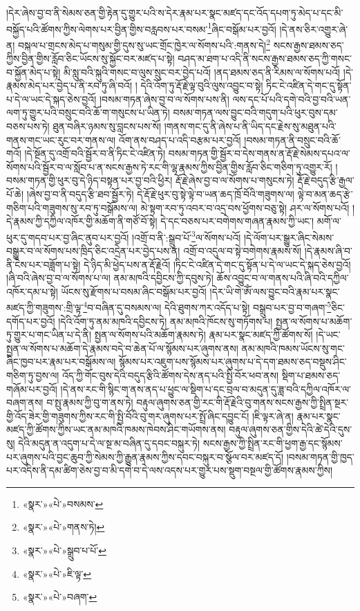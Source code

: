 །དེར་ཞེས་བྱ་བ་ནི་སེམས་ཅན་གྱི་རྟེན་དུ་གྱུར་པའི་ས་དེར་རྣམ་པར་སྣང་མཛད་དང་འོད་དཔག་ཏུ་མེད་པ་དང་མི་བསྐྱོད་པའི་ཚོགས་ཀྱིས་ལེགས་པར་བྱིན་གྱིས་བརླབས་པར་བསམ་\footnote{«སྣར་»«པེ་»བསམས་}ཞིང་བསྒོམ་པར་བྱའོ། །དེ་ནས་ཅིར་འགྱུར་ཞེ་ན། བསྐལ་པ་གྲངས་མེད་པ་གསུམ་གྱི་དུས་སུ་ཡང་གྲོང་ཁྱེར་ལ་སོགས་པའི་:གནས་དེ།\footnote{«སྣར་»«པེ་»གནས་ཏེ།} སངས་རྒྱས་ཐམས་ཅད་ཀྱིས་བྱིན་གྱིས་རློབ་ཅིང་ཡོངས་སུ་སྐྱོང་བར་མཛད་པ་སྟེ། བཤད་མ་ཐག་པ་འདི་ནི་སངས་རྒྱས་ཐམས་ཅད་ཀྱི་གསང་བ་སྐྱོན་མེད་པ་སྟེ། མི་སླུ་བའི་སྐུའི་གསང་བ་ལུས་སྲུང་བར་བྱེད་པའོ། །ནད་ཐམས་ཅད་ནི་རིམས་ལ་སོགས་པའོ། །དེ་རྣམས་མེད་པར་བྱེད་པ་ནི་རབ་ཏུ་ཞི་བའོ། །
དེའི་འོག་ཏུ་རྡོ་རྗེ་ལྟ་བུའི་ལུས་འབྱུང་བ་སྟེ། ཏིང་ངེ་འཛིན་དེ་གང་དུ་སྟོན་པ་དེ་ལ་ཡང་དེ་སྐད་ཅེས་བྱའོ། །བསམ་གཏན་ཞེས་བྱ་བ་ལ་སོགས་པས་ནི། ལས་དང་པོ་པའི་དགེ་བའི་བྱ་བའི་ཡན་ལག་ཏུ་གྱུར་པའི་བསྲུང་བའི་ཆོ་ག་གསུངས་པ་ཡིན་ཏེ། བསམ་གཏན་ལས་བྱུང་བའི་གདུག་པའི་ཕུར་བུས་དམ་བཅས་པས་ཏེ། ཐུན་བཞིར་ཉམས་སུ་བླངས་པས་སོ། །གནས་གང་དུ་ནི་ཞེས་པ་ནི་ཡིད་དང་རྗེས་སུ་མཐུན་པའི་གནས་གང་ཡང་རུང་བར་གནས་ལ། འོག་ནས་བཤད་པ་འདི་བརྩམ་པར་བྱའོ། །བསམ་གཏན་ནི་བསྲུང་བའི་ཆོ་གའོ། །དེ་སྔོན་དུ་འགྲོ་བའི་སྦྱོར་བ་ནི་ཏིང་ངེ་འཛིན་ཏེ། བསམ་གཏན་གྱི་སྦྱོར་བ་དེས་གནས་ན་རྡོ་རྗེ་སེམས་དཔའ་ལ་སོགས་པའི་སྦྱོར་བ་ལ་སློབ་པ་ན་སངས་རྒྱས་ཏེ་རང་གི་ལྷ་རྣམས་ཀྱིས་བྱིན་གྱིས་རློབ་ཅིང་གཅིག་ཏུ་འགྱུར་རོ། །བསམ་གཏན་གྱི་ཕུར་བུ་དེ་ཉིད་བསྟན་པར་བྱ་བའི་ཕྱིར། རྡོ་རྗེ་ཞེས་བྱ་བ་ལ་སོགས་པ་གསུངས་ཏེ། རྡོ་རྗེ་བདུད་རྩི་རྒྱལ་པོ་ཆེ། །ཞེས་བྱ་བ་ནི་བདུད་རྩི་ཐབ་སྦྱོར་ཏེ། དེ་རྡོ་རྗེ་ཕུར་བུ་སྟེ་ལྟེ་བ་ཡན་ཆད་ཁྲོ་བོའི་གཟུགས་ལ། ལྟེ་བ་མན་ཆད་རྩེ་གཅིག་པའི་གཟུགས་སུ་རབ་ཏུ་བསྒོམས་ལ། མེ་སྟག་རབ་ཏུ་འབར་བ་འདྲ་བས་ཕྱོགས་བཅུ་སྟེ། ཤར་ལ་སོགས་པའོ། །དེ་རྣམས་ཀྱི་དཀྱིལ་འཁོར་གྱི་མཆོག་ནི་གཙོ་བོ་སྟེ། དེ་དང་བཅས་པར་བགེགས་གཞན་རྣམས་ཀྱི་ཡང་། མགོ་ལ་ཕུར་དུ་གདབ་པར་བྱ་ཞིང་ནུབ་པར་བྱའོ། །འགྲོ་བ་ནི་:སྒྲུབ་པོ་\footnote{«སྣར་»«པེ་»སྒྲུབ་པ་པོ་}ལ་སོགས་པའོ། །དེ་ལོག་པར་སྒྱུར་ཞིང་སེམས་བསྒྱུར་བ་ལ་སོགས་པས་ཁྲིད་ཅིང་འདྲེན་པར་བྱེད་པས་ན། འགྲོ་བ་འདུལ་བ་སྟེ་བགེགས་རྣམས་སོ། །དེ་རྣམས་ཞི་བ་ནི་ངེས་པར་བཟློག་པ་སྟེ། དེ་ཉིད་མི་ཕྱེད་པས་ན་རྡོ་རྗེའོ། །ཏིང་ངེ་འཛིན་དེ་གང་དུ་སྟོན་པ་དེ་ལ་ཡང་དེ་སྐད་ཅེས་བྱའོ། །ཞི་བའི་ཞེས་བྱ་བ་ལ་སོགས་པ་ལ། ནམ་མཁའི་དབྱིངས་ཀྱི་དབུས་ཏེ། ཆོས་འབྱུང་བ་ལ་གནས་པའི་ཞི་བའི་དཀྱིལ་འཁོར་དམ་པ་སྟེ། ཡོངས་སུ་རྫོགས་པ་བསམ་ཞིང་བསྒོམ་པར་བྱའོ། །དེར་ཡི་གེ་ཨོཾ་ལས་བྱུང་བའི་རྣམ་པར་སྣང་མཛད་ཀྱི་གཟུགས་:གྲི་ལྟ་\footnote{«སྣར་»«པེ་»ཇི་ལྟ་}བ་བཞིན་དུ་བསམས་ལ། དེའི་ཐུགས་ཀར་འདོད་པ་སྟེ། བསྒྲུབ་པར་བྱ་བ་གཞག་\footnote{«སྣར་»«པེ་»བཞག་}ཅིང་དགོད་པར་བྱའོ། །དེའི་འོག་ཏུ་ནམ་མཁའི་དབྱིངས་ཏེ། ནམ་མཁའི་ཁོངས་སུ་གཏོགས་པ། སྤྱན་ལ་སོགས་པ་མཆོག་ཏུ་གྱུར་པ་གང་ཡིན་པ་དེ་ནི། སྤྱན་ལ་སོགས་པའི་མཆོག་རྣམས་ཏེ། རྣམ་པར་སྣང་མཛད་ཀྱི་ཚོགས་སོ། །དེ་ཡང་སྤྱན་ལ་སོགས་པ་མཆོག་དེ་རྣམས་བདེ་བ་ཆེན་པོ་ལ་སྙོམས་པར་ཞུགས་ནས། ནམ་མཁའི་ཁམས་ཡོངས་སུ་གང་ཞིང་ཁྱབ་པར་རྣམ་པར་བསྒོམས་ལ། སྙོམས་པར་འཇུག་པས་སྙོམས་པར་ཞུགས་པ་དེ་དག་ཐམས་ཅད་བསྡུས་ཤིང་གཅིག་ཏུ་བྱས་ལ། འོད་ཀྱི་གོང་བུས་དེའི་བདུད་རྩིའི་ཚོགས་དེས་ནད་པའི་སྤྱི་བོར་ཕབ་ནས། སྡིག་པ་ཐམས་ཅད་གཞོམ་པར་བྱའོ། །དེ་ནས་རང་གི་སྙིང་ག་ནས་ནད་པ་ཕྱུང་ལ་སྡིག་པ་དང་བྲལ་བ་མདུན་དུ་ཟླ་བའི་དཀྱིལ་འཁོར་ལ་བཞག་ནས། བ་སྤུ་རྣམས་ཀྱི་བུ་ག་ནས་ཏེ། བརྟུལ་ཞུགས་ཅན་གྱི་རང་གི་རྡོ་རྗེའི་བུ་གནས་སངས་རྒྱས་ཀྱི་སྤྲིན་སྔར་གྱི་འོད་ཟེར་གྱི་གཟུགས་ཀྱིས་རང་གི་སྤྱི་བོའི་བུ་གར་ཞུགས་པར་སྤྲོ་ཞིང་དབྱུང་ངོ། །ཇི་ལྟར་ཞེ་ན། རྣམ་པར་སྣང་མཛད་ཀྱི་ཚོགས་ཀྱིས་ཡང་ནམ་མཁའི་ཁམས་ཁེབས་ཤིང་གཡོགས་ནས། བརྟུལ་ཞུགས་ཅན་གྱིས་དེའི་ཚེ་དེའི་དུས་སུ། དེའི་མདུན་ན་འདུག་པ་དེ་ལ་སྔ་མ་བཞིན་དུ་དབང་བསྐུར་ཏེ། སངས་རྒྱས་ཀྱི་སྤྲིན་རང་གི་ཕྱག་རྒྱ་དང་སྙོམས་པར་ཞུགས་པའི་བྱང་ཆུབ་ཀྱི་སེམས་ཀྱི་རྒྱུན་རྣམས་ཀྱིས་དབང་བསྐུར་བ་སྩོལ་བར་མཛད་དོ། །བསམ་གཏན་གྱི་ཁྱད་པར་འདིས་ནི་དམ་ཚིག་ཅེས་བྱ་བ་མི་དགེ་བ་དེ་ལས་འདས་པར་གྱུར་པས་སྡུག་བསྔལ་གྱི་ཚོགས་རྣམས་ཀྱིས། 